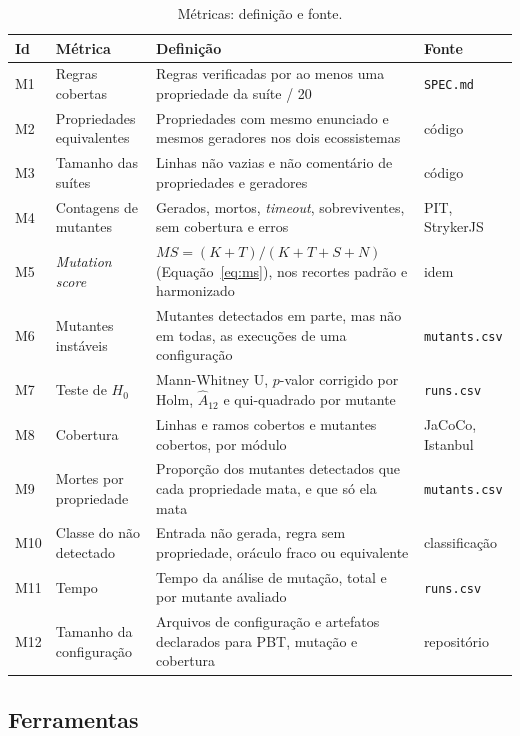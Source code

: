 \begin{table}[!htbp]
\centering
\caption{Métricas: definição e fonte.}
\label{tab:metricas}
\small
\begin{tabularx}{\textwidth}{@{}l L{3.0cm} Y L{2.55cm}@{}}
\toprule
Id & Métrica & Definição & Fonte \\
\midrule
M1 & Regras cobertas & Regras verificadas por ao menos uma propriedade da suíte / 20 & \texttt{SPEC.md} \\
M2 & Propriedades equivalentes & Propriedades com mesmo enunciado e mesmos geradores nos dois ecossistemas & código \\
M3 & Tamanho das suítes & Linhas não vazias e não comentário de propriedades e geradores & código \\
M4 & Contagens de mutantes & Gerados, mortos, \textit{timeout}, sobreviventes, sem cobertura e erros & PIT, StrykerJS \\
M5 & \textit{Mutation score} & $MS = (K+T)/(K+T+S+N)$ (Equação~\ref{eq:ms}), nos recortes padrão e harmonizado & idem \\
M6 & Mutantes instáveis & Mutantes detectados em parte, mas não em todas, as execuções de uma configuração & \texttt{mutants.csv} \\
M7 & Teste de $H_0$ & Mann-Whitney U, $p$-valor corrigido por Holm, $\hat{A}_{12}$ e qui-quadrado por mutante & \texttt{runs.csv} \\
M8 & Cobertura & Linhas e ramos cobertos e mutantes cobertos, por módulo & JaCoCo, Istanbul \\
M9 & Mortes por propriedade & Proporção dos mutantes detectados que cada propriedade mata, e que só ela mata & \texttt{mutants.csv} \\
M10 & Classe do não detectado & Entrada não gerada, regra sem propriedade, oráculo fraco ou equivalente & classificação \\
M11 & Tempo & Tempo da análise de mutação, total e por mutante avaliado & \texttt{runs.csv} \\
M12 & Tamanho da configuração & Arquivos de configuração e artefatos declarados para PBT, mutação e cobertura & repositório \\
\bottomrule
\end{tabularx}
\end{table}

\subsection{Ferramentas}

